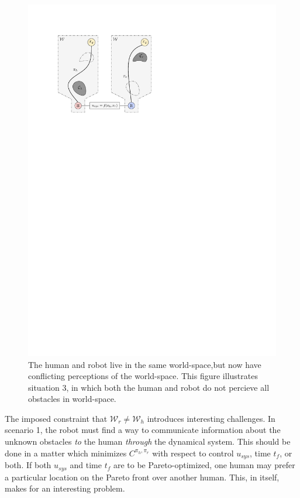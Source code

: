 \documentclass[conference]{IEEEtran}
\begin{document}
\begin{figure}[h!]
\begin{center}
\includegraphics{diag2.pdf}
  \caption{ The human and robot live in the same world-space,but now have conflicting perceptions of the world-space. This figure illustrates situation 3, in which both the human and robot do not percieve all obstacles in world-space.}
\end{center}
\end{figure}
\hspace{2cm} 

The imposed constraint that $\mathcal{W}_r \neq \mathcal{W}_h$ introduces interesting challenges. In scenario 1, the robot must find a way to communicate information about the unknown obstacles \textit{to} the human \textit{through} the dynamical system. This should be done in a matter which minimizes $C^{\pi_h,\pi_r}$ with respect to control $u_{sys}$, time $t_f$, or both. If both $u_{sys}$ and time $t_f$ are to be Pareto-optimized, one human may prefer a particular location on the Pareto front over another human. This, in itself, makes for an interesting problem. 
\end{document}
